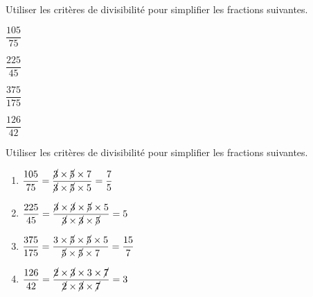 \begin{exercice*}
    Utiliser les critères de divisibilité pour simplifier les fractions suivantes.
    \begin{enumerate}
            \setlength{\columnseprule}{0pt}
            \begin{multicols}{4}
                \item $\dfrac{105}{75}$
                \item $\dfrac{225}{45}$
                \item $\dfrac{375}{175}$
                \item $\dfrac{126}{42}$
            \end{multicols}
    \end{enumerate}    
\end{exercice*}
\begin{corrige}
    Utiliser les critères de divisibilité pour simplifier les fractions suivantes.
    
    \begin{enumerate}
        \item $\dfrac{105}{75}=\dfrac{\cancel{3}\times\cancel{5}\times7}{\cancel{3}\times\cancel{5}\times5}=\dfrac{7}{5}$
        \item $\dfrac{225}{45}=\dfrac{\cancel{3}\times\cancel{3}\times\cancel{5}\times5}{\cancel{3}\times\cancel{3}\times\cancel{5}}=5$
        \item $\dfrac{375}{175}=\dfrac{3\times\cancel{5}\times\cancel{5}\times5}{\cancel{5}\times\cancel{5}\times7}=\dfrac{15}{7}$
        \item $\dfrac{126}{42}=\dfrac{\cancel{2}\times\cancel{3}\times3\times\cancel{7}}{\cancel{2}\times\cancel{3}\times\cancel{7}}=3$
    \end{enumerate}
\end{corrige}

